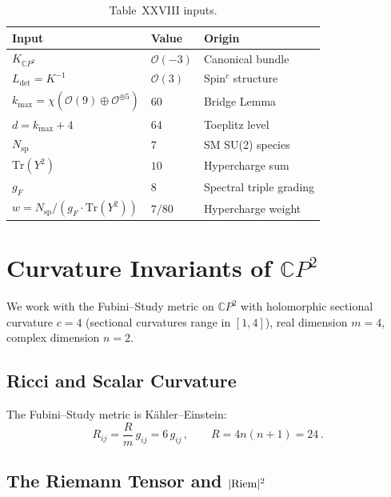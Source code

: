 \documentclass[12pt,a4paper]{article}
\theoremstyle{definition}
\begin{document}
\begin{table}[h]
\centering
\renewcommand{\arraystretch}{1.3}
\begin{tabular}{lll}
\toprule
\textbf{Input} & \textbf{Value} & \textbf{Origin} \\
\midrule
$K_{\mathbb{C}P^2}$ & $\mathcal{O}(-3)$ & Canonical bundle \\
$L_{\det} = K^{-1}$ & $\mathcal{O}(3)$ & Spin$^c$ structure \\
$k_{\max} = \chi(\mathcal{O}(9) \oplus \mathcal{O}^{\oplus 5})$ & $60$ & Bridge Lemma \\
$d = k_{\max} + 4$ & $64$ & Toeplitz level \\
$N_{\mathrm{sp}}$ & $7$ & SM SU(2) species \\
$\mathrm{Tr}(Y^2)$ & $10$ & Hypercharge sum \\
$g_F$ & $8$ & Spectral triple grading \\
$w = N_{\mathrm{sp}}/(g_F \cdot \mathrm{Tr}(Y^2))$ & $7/80$ & Hypercharge weight \\
\bottomrule
\end{tabular}
\caption{Table~XXVIII inputs.}
\end{table}

\section{Curvature Invariants of $\mathbb{C}P^2$}
\label{sec:CP2}

We work with the Fubini--Study metric on $\mathbb{C}P^2$ with
holomorphic sectional curvature $c = 4$ (sectional curvatures
range in $[1,4]$), real dimension $m = 4$, complex dimension $n = 2$.

\subsection{Ricci and Scalar Curvature}

The Fubini--Study metric is K\"ahler--Einstein:
\begin{equation}
R_{ij} = \frac{R}{m}\,g_{ij} = 6\,g_{ij}\,,\qquad
R = 4n(n+1) = 24\,.
\end{equation}

\subsection{The Riemann Tensor and $|{\rm Riem}|^2$}
\end{document}
